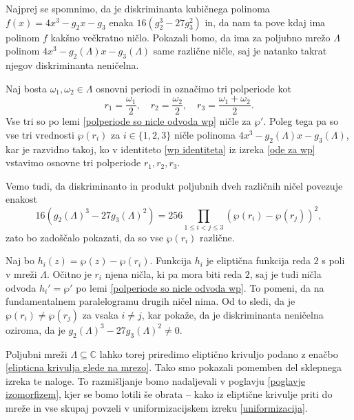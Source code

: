 \documentclass[mat1]{fmfdelo}
\numberwithin{equation}{section}
\newcommand{\C}{\mathbb C}
\newcommand{\om}{\omega}
\theoremstyle{definition}
\begin{document}
\begin{dokaz}
    Najprej se spomnimo, da je diskriminanta kubičnega polinoma $f(x) = 4x^3 - g_2 x - g_3$ enaka $16(g_2^3 - 27g_3^2)$ in, da nam ta pove kdaj ima polinom $f$ kakšno večkratno ničlo. Pokazali bomo, da ima za poljubno mrežo $\Lambda$ polinom $4x^3 - g_2(\Lambda) x - g_3(\Lambda)$ same različne ničle, saj je natanko takrat njegov diskriminanta neničelna.  

    Naj bosta $\om_1, \om_2 \in \Lambda$ osnovni periodi in označimo tri polperiode kot
    \[
        r_1 = \frac{\om_1}{2}, \quad r_2 = \frac{\om_2}{2}, \quad r_3 = \frac{\om_1 + \om_2}{2}.
    \]
    Vse tri so po lemi \ref{polperiode so nicle odvoda wp} ničle za $\wp'$. Poleg tega pa so vse tri vrednosti $\wp(r_i)$ za $i \in \{1,2,3\}$ ničle polinoma $4x^3 - g_2(\Lambda) x - g_3(\Lambda)$, kar je razvidno takoj, ko v identiteto \ref{wp identiteta} iz izreka \ref{ode za wp} vstavimo osnovne tri polperiode $r_1, r_2, r_3$.
    
    Vemo tudi, da diskriminanto in produkt poljubnih dveh različnih ničel povezuje enakost 
    \[
        16(g_2(\Lambda)^3 - 27g_3(\Lambda)^2) = 256\prod_{1 \leq i < j \leq 3}(\wp(r_i) - \wp(r_j))^2,  
    \]
    zato bo zadoščalo pokazati, da so vse $\wp(r_i)$ različne.
    
    Naj bo $h_i(z) = \wp(z) - \wp(r_i)$. Funkcija $h_i$ je eliptična funkcija reda $2$ s poli v mreži $\Lambda$. Očitno je $r_i$ njena ničla, ki pa mora biti reda $2$, saj je tudi ničla odvoda $h_i' = \wp'$ po lemi \ref{polperiode so nicle odvoda wp}. To pomeni, da na fundamentalnem paralelogramu drugih ničel nima. Od to sledi, da je $\wp(r_i) \neq \wp(r_j)$ za vsaka $i \neq j$, kar pokaže, da je diskriminanta neničelna oziroma, da je $g_2(\Lambda)^3 - 27g_3(\Lambda)^2 \neq 0$. 
\end{dokaz}

Poljubni mreži $\Lambda \subseteq \C$ lahko torej priredimo eliptično krivuljo podano z enačbo \ref{elipticna krivulja glede na mrezo}. Tako smo pokazali pomemben del sklepnega izreka te naloge. To razmišljanje bomo nadaljevali v poglavju \ref{poglavje izomorfizem}, kjer se bomo lotili še obrata -- kako iz eliptične krivulje priti do mreže in vse skupaj povzeli v uniformizacijskem izreku \ref{uniformizacija}.

\break




\end{document}
